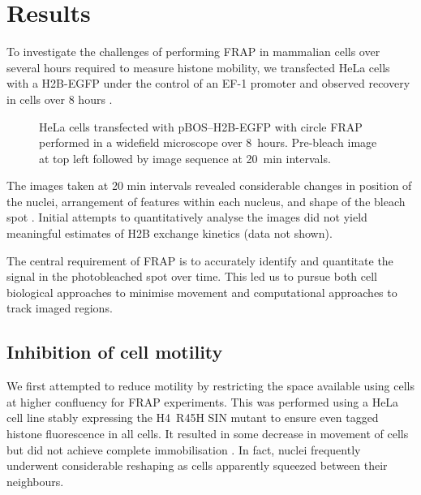 \section{Results}

    To investigate the challenges of performing FRAP in mammalian cells 
    over several hours required to measure histone mobility,
    we transfected HeLa cells with a H2B-EGFP under the control of an EF-1\textalpha{} promoter
    and observed recovery in cells over 8 hours .
    
    \begin{figure}
      \centering
         {HeLa cells transfected with pBOS--H2B-EGFP
         with circle FRAP performed in a widefield microscope over 8~hours.
         Pre-bleach image at top left followed by image sequence at 20~min intervals.}
      \label{fig:kill-frap:cell-movement}
    \end{figure}

    The images taken at 20 min intervals revealed considerable changes
    in position of the nuclei, arrangement of features within each nucleus, 
    and shape of the bleach spot .
    Initial attempts to quantitatively analyse the images
    did not yield meaningful estimates of H2B exchange kinetics (data not shown).

    The central requirement of FRAP is to accurately identify and 
    quantitate the signal in the photobleached spot over time.
    This led us to pursue both cell biological approaches to minimise movement 
    and computational approaches to track imaged regions.


  \subsection{Inhibition of cell motility}

    We first attempted to reduce motility by restricting the space available
    using cells at higher confluency for FRAP experiments.
    This was performed using a HeLa cell line stably expressing 
    the H4~R45H SIN mutant to ensure even tagged histone fluorescence in all cells.
    It resulted in some decrease in movement of cells
    but did not achieve complete immobilisation .
    In fact, nuclei frequently underwent considerable reshaping as cells 
    apparently squeezed between their neighbours.


